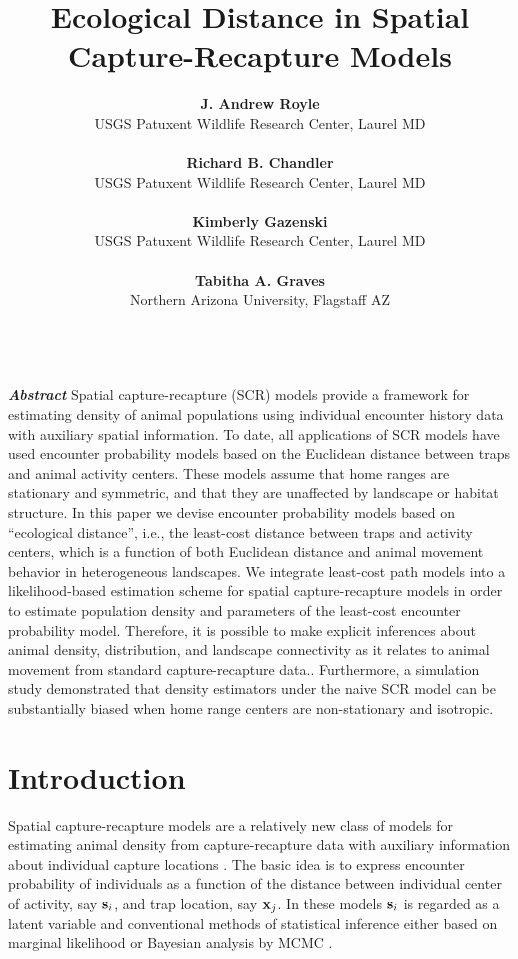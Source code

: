 \documentclass[12pt]{article}
\title{Ecological Distance in Spatial Capture-Recapture Models}
\author{
{\bf J. Andrew Royle}\\
USGS Patuxent Wildlife Research Center, Laurel MD \\ \\
{\bf Richard B. Chandler} \\
USGS Patuxent Wildlife Research Center, Laurel MD\\ \\
{\bf Kimberly Gazenski} \\
USGS Patuxent Wildlife Research Center, Laurel MD\\ \\
{\bf Tabitha A. Graves} \\
Northern Arizona University, Flagstaff AZ \\ \\
}
\begin{document}

\maketitle

\date

\newpage

\linenumbers

\begin{flushleft}
{\em \bf Abstract}
Spatial capture-recapture (SCR) models provide a framework for estimating density of 
animal populations using individual encounter history data with auxiliary spatial information. 
To date, all applications of SCR models have used encounter probability models based on 
the Euclidean distance between traps and animal activity centers. These models assume 
that home ranges are stationary and symmetric, and that they are unaffected by landscape 
or habitat structure. In this paper we devise encounter probability models based on 
``ecological distance'', i.e., the least-cost distance between traps and activity centers, 
which is a function of both Euclidean distance and animal movement behavior in heterogeneous 
landscapes. We integrate least-cost path models into a likelihood-based estimation
scheme for spatial capture-recapture models in order to estimate population density and 
parameters of the least-cost encounter probability model.  
Therefore, it is possible to make explicit inferences about animal density, distribution, 
and landscape connectivity as it relates to animal movement from standard capture-recapture data.. 
Furthermore, a simulation study demonstrated that density estimators under the naive SCR 
model can be substantially biased when home range centers are non-stationary and isotropic. 
\end{flushleft}

\section{Introduction}


Spatial capture-recapture models are a relatively new class of models
for estimating animal density from capture-recapture data with
auxiliary information about individual capture locations
\citep{borchers_efford:2008, royle_young:2008, efford_etal:2009,
  royle_etal:2009ecol}.
The basic idea is to express encounter probability of
individuals as a function of the distance between individual center of
activity, say ${\bf s}_{i}$, and trap location, say ${\bf x}_{j}$.  In
these models ${\bf s}_{i}$ is regarded as a latent variable and
conventional methods of statistical inference either based on marginal
likelihood \citep{borchers_efford:2008} or Bayesian analysis by MCMC
\citep{royle_young:2008}.
\end{document}
